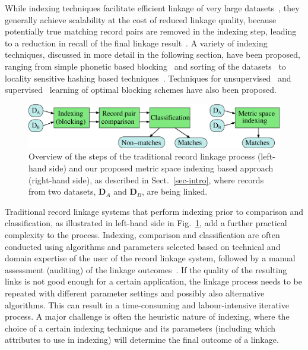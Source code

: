\documentclass{llncs}
\begin{document}
While indexing techniques facilitate efficient linkage of very large
datasets~\cite{Don15}, they generally achieve scalability at the cost
of reduced linkage quality, because potentially true matching record
pairs are removed in the indexing step, leading to a reduction in
recall of the final linkage result~\cite{Chr12}. A variety of indexing
techniques, discussed in more detail in the following section, have
been proposed, ranging from simple phonetic based blocking~\cite{Chr12}
and sorting of the datasets~\cite{Dra12} to locality sensitive hashing
based techniques~\cite{Kim10,Steorts2014}. Techniques for
unsupervised~\cite{Kej13,Ram15} and supervised~\cite{Bil06,Mic06}
learning of optimal blocking schemes have also been proposed.


\begin{figure}[!t]
  \centering
  \includegraphics[width=1.0\textwidth]{figures/linkage-process}
  \caption{Overview of the steps of the traditional record linkage
           process (left-hand side) and our proposed metric space
           indexing based approach (right-hand side), as described in
           Sect.~\ref{sec-intro}, where records from two datasets,
           $\mathbf{D}_A$ and $\mathbf{D}_B$, are being linked.}
           \label{fig-rl-process}
\end{figure}


Traditional record linkage systems that perform indexing prior to
comparison and classification, as illustrated in left-hand side in
Fig.~\ref{fig-rl-process}, add a further practical complexity to the
process. Indexing, comparison and classification are often conducted
using algorithms and parameters selected based on technical and
domain expertise of the user of the record linkage system, followed
by a manual assessment (auditing) of the linkage
outcomes~\cite{Chr12}. If the quality of the resulting links is not
good enough for a certain application, the linkage process needs to
be repeated with different parameter settings and possibly also
alternative algorithms. This can result in a time-consuming and
labour-intensive iterative process. A major challenge is often the
heuristic nature of indexing, where the choice of a certain indexing
technique and its parameters (including which attributes to use in indexing) will determine the final outcome of a linkage.
\end{document}
